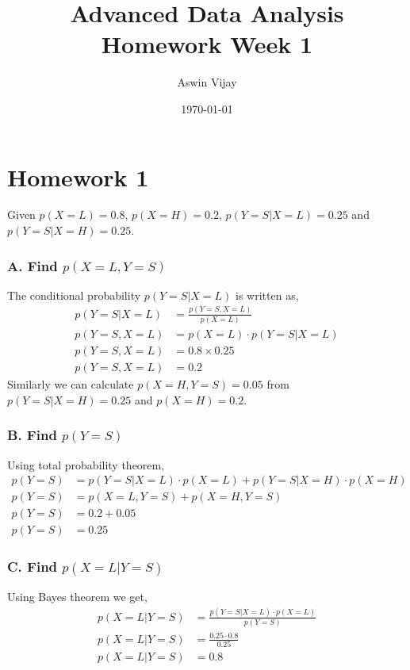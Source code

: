 \documentclass{article}
\title{Advanced Data Analysis\\Homework Week 1}
\author{Aswin Vijay}
\date\today
\begin{document}
\maketitle %

\section*{Homework 1}

Given $p(X=L)=0.8$, $p(X=H)=0.2$, $p(Y=S|X=L)=0.25$ and $p(Y=S|X=H)=0.25$.

\subsubsection*{A. Find $p(X=L,Y=S)$ }
The conditional probability $p(Y=S|X=L)$ is written as,
\begin{align*}
    p(Y=S|X=L) &= \frac{p(Y=S,X=L)}{p(X=L)} \\
    p(Y=S,X=L) &= p(X=L)\cdot p(Y=S|X=L) \\
    p(Y=S,X=L) &= 0.8\times 0.25 \\
    p(Y=S,X=L) &= 0.2
\end{align*}
Similarly we can calculate $p(X=H,Y=S)=0.05$ from $p(Y=S|X=H)=0.25$ and $p(X=H)=0.2$.

\subsubsection*{B. Find $p(Y=S)$ }
Using total probability theorem,
\begin{align*}
    p(Y=S) &= p(Y=S|X=L)\cdot p(X=L) + p(Y=S|X=H)\cdot p(X=H) \\
    p(Y=S) &= p(X=L,Y=S) + p(X=H,Y=S) \\
    p(Y=S) &= 0.2 + 0.05 \\
    p(Y=S) &= 0.25 
\end{align*}

\subsubsection*{C. Find $p(X=L|Y=S)$ }
Using Bayes theorem we get,
\begin{align*}
    p(X=L|Y=S) &= \frac{p(Y=S|X=L)\cdot p(X=L)}{p(Y=S)}\\
    p(X=L|Y=S) &= \frac{0.25\cdot 0.8}{0.25}\\
    p(X=L|Y=S) &= 0.8
\end{align*}
\end{document}
